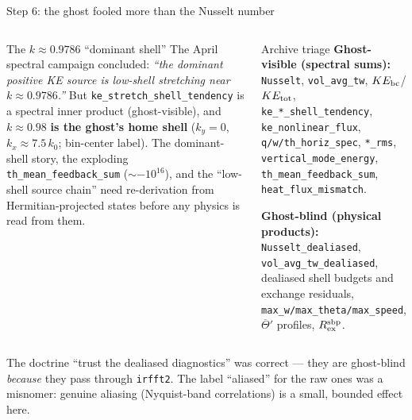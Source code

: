 \documentclass[aspectratio=169,10pt]{beamer}
\newcommand{\Tb}{\overline{\Theta}}
\begin{document}
\begin{frame}{Step 6: the ghost fooled more than the Nusselt number}
  \begin{columns}[T]
    \begin{alertblock}{The $k\approx0.9786$ ``dominant shell''}
      The April spectral campaign concluded: \emph{``the dominant positive KE source
      is low-shell stretching near $k\approx0.9786$.''} But
      \texttt{ke\_stretch\_shell\_tendency} is a spectral inner product
      (ghost-visible), and $k\approx0.98$ \textbf{is the ghost's home shell}
      ($k_y{=}0$, $k_x\approx7.5\,k_0$; bin-center label). The dominant-shell
      story, the exploding \texttt{th\_mean\_feedback\_sum} ($\sim-10^{16}$), and the
      ``low-shell source chain'' need re-derivation from Hermitian-projected states
      before any physics is read from them.
    \end{alertblock}
    \begin{block}{Archive triage}
      \footnotesize
      \textbf{Ghost-visible (spectral sums):}\\
      \texttt{Nusselt}, \texttt{vol\_avg\_tw}, $KE_{\rm bc}$/$KE_{\rm tot}$,
      \texttt{ke\_*\_shell\_tendency}, \texttt{ke\_nonlinear\_flux},
      \texttt{q/w/th\_horiz\_spec}, \texttt{*\_rms},
      \texttt{vertical\_mode\_energy}, \texttt{th\_mean\_feedback\_sum},
      \texttt{heat\_flux\_mismatch}.
      \par\smallskip
      \textbf{Ghost-blind (physical products):}\\
      \texttt{Nusselt\_dealiased}, \texttt{vol\_avg\_tw\_dealiased},
      dealiased shell budgets and exchange residuals,
      \texttt{max\_w/max\_theta/max\_speed}, $\Tb'$ profiles,
      $R_{\rm ex}^{\rm sbp}$.
    \end{block}
  \end{columns}
  \medskip
  \small The doctrine ``trust the dealiased diagnostics'' was correct ---
  they are ghost-blind \emph{because} they pass through \texttt{irfft2}.
  The label ``aliased'' for the raw ones was a misnomer: genuine aliasing
  (Nyquist-band correlations) is a small, bounded effect here.
\end{frame}
\end{document}

